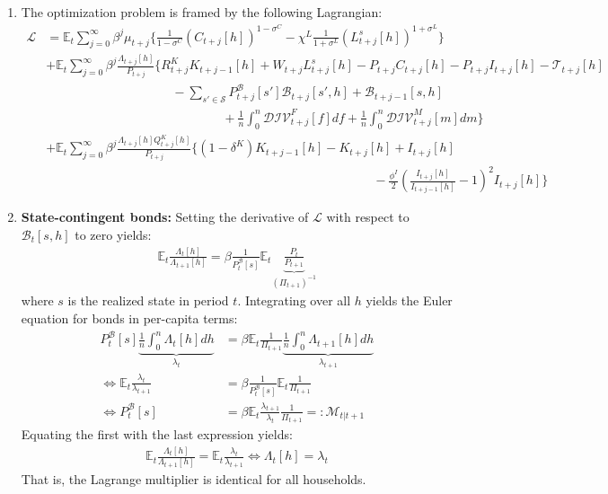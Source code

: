\begin{enumerate}

\item
The optimization problem is framed by the following Lagrangian:
\begin{align*}
\mathcal{L} &= \mathbb{E}_{t} \sum_{j=0}^{\infty} \beta^{j} \mu_{t+j} \Bigg \{
  \frac{1}{1-\sigma^{C}} {(C_{t+j}[h])}^{1-\sigma^{C}}
  - \chi^{L} \frac{1}{1+\sigma^{L}} {(L^{s}_{t+j}[h])}^{1+\sigma^{L}}
  \Bigg \}
\\
&+ \mathbb{E}_{t} \sum_{j=0}^{\infty} \beta^{j} \frac{\Lambda_{t+j}[h]}{P_{t+j}} \Bigg \{
  R^{K}_{t+j} K_{t+j-1}[h]
+ W_{t+j} L^{s}_{t+j}[h]
- P_{t+j} C_{t+j}[h] - P_{t+j} I_{t+j}[h]
- \mathcal{T}_{t+j}[h]
\\
&\qquad\qquad\qquad\qquad\qquad
- \sum_{s' \in \mathcal{S}} P^{\mathcal{B}}_{t+j}[s'] \mathcal{B}_{t+j}[s',h]
+ \mathcal{B}_{t+j-1}[s,h]
\\
&\qquad\qquad\qquad\qquad\qquad\qquad\qquad
+ \frac{1}{n} \int_{0}^{n} \mathcal{DIV}^{F}_{t+j}[f] df
+ \frac{1}{n} \int_{0}^{n} \mathcal{DIV}^{M}_{t+j}[m] dm
\Bigg \}
\\
&+ \mathbb{E}_{t} \sum_{j=0}^{\infty} \beta^{j} \frac{\Lambda_{t+j}[h] Q^{K}_{t+j}[h]}{P_{t+j}} \Bigg \{
(1-\delta^{K}) K_{t+j-1}[h]  - K_{t+j}[h] + I_{t+j}[h] 
\\
&\qquad\qquad\qquad\qquad\qquad\qquad\qquad\qquad\qquad\qquad\qquad\qquad\qquad
- \frac{\phi^{I}}{2} {\left(\frac{I_{t+j}[h]}{I_{t+j-1}[h]} - 1 \right)}^2 I_{t+j}[h]
\Bigg \}
\end{align*}

\item
\textbf{State-contingent bonds:} Setting the derivative of \(\mathcal{L}\) with respect to \(\mathcal{B}_{t}[s,h]\) to zero yields:
\begin{align*}
\mathbb{E}_{t} \frac{\Lambda_{t}[h]}{\Lambda_{t+1}[h]} = \beta \frac{1}{P^{\mathcal{B}}_{t}[s]} \mathbb{E}_{t} \underbrace{\frac{P_{t}}{P_{t+1}}}_{{(\Pi_{t+1})}^{-1}}
\end{align*}
where \(s\) is the realized state in period \(t\).
Integrating over all \(h\) yields the Euler equation for bonds in per-capita terms:
\begin{align*}
P^{\mathcal{B}}_{t}[s] \underbrace{\frac{1}{n} \int_{0}^{n} \Lambda_{t}[h] dh}_{\lambda_{t}}  &= \beta \mathbb{E}_{t} \frac{1}{\Pi_{t+1}} \underbrace{\frac{1}{n}\int_{0}^{n} \Lambda_{t+1}[h] dh}_{\lambda_{t+1}}
\\
\Leftrightarrow
\mathbb{E}_{t} \frac{\lambda_{t}}{\lambda_{t+1}} &= \beta \frac{1}{P^{\mathcal{B}}_{t}[s]} \mathbb{E}_{t} \frac{1}{\Pi_{t+1}}
\\
\Leftrightarrow
P^{\mathcal{B}}_{t}[s] &= \beta \mathbb{E}_{t} \frac{\lambda_{t+1}}{\lambda_{t}} \frac{1}{\Pi_{t+1}} =: \mathcal{M}_{t|t+1}
\end{align*}
Equating the first with the last expression yields:
\begin{gather*}
\mathbb{E}_{t} \frac{\Lambda_{t}[h]}{\Lambda_{t+1}[h]} = \mathbb{E}_{t} \frac{\lambda_{t}}{\lambda_{t+1}}
\Leftrightarrow
\Lambda_{t}[h] = \lambda_{t}
\end{gather*}
That is, the Lagrange multiplier is identical for all households.


\end{enumerate}
